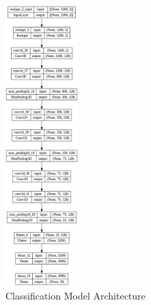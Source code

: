 \begin{figure}[h!]
  \centering
    \includegraphics[width=0.25\textwidth]{figures/model_architecture.png}
    \caption{Classification Model Architecture}
    \label{model_arch}
\end{figure}

